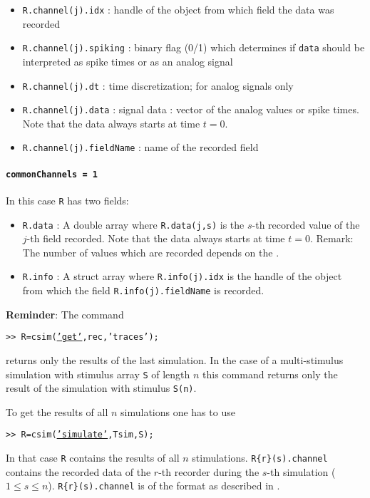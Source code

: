 \begin{itemize}
  
\item \texttt{R.channel(j).idx} : handle of the object from which
  field the data was recorded
  
\item \texttt{R.channel(j).spiking} : binary flag (0/1) which
  determines if \texttt{data} should be interpreted as spike times or
  as an analog signal
  
\item \texttt{R.channel(j).dt} : time discretization; for analog
  signals   only
  
\item \texttt{R.channel(j).data} : signal data : vector of the
  analog values or spike times. Note that the data always starts at
  time $t=0$.
 
\item \texttt{R.channel(j).fieldName} : name of the recorded
    field

\end{itemize}

\paragraph{\texttt{commonChannels = 1}} In this case
\texttt{R} has two fields:
\begin{itemize}
\item \texttt{R.data} : A double array where
  \texttt{R.data(j,s)} is the $s$-th recorded value of the $j$-th
  field recorded.  Note that the data always
  starts at time $t=0$.  {\small Remark: The number of values which
    are recorded depends on the .}
  
\item \texttt{R.info} : A struct array where
  \texttt{R.info(j).idx} is the handle of the object from which
  the field \texttt{R.info(j).fieldName} is recorded.
\end{itemize}


{\bf Reminder}: The command
\begin{tabbing}
\quad\texttt{>> R=csim(\hyperlink{cmd:get}{'get'},rec,'traces');}
\end{tabbing}
returns only the results of the last simulation. In the case of a
multi-stimulus simulation with stimulus array \texttt{S} of length $n$
this command returns only the result of the simulation with stimulus
\texttt{S(n)}.

To get the results of all $n$ simulations one has to use
\begin{tabbing}
\quad\texttt{>> R=csim(\hyperlink{cmd:simulate}{'simulate'},Tsim,S);}
\end{tabbing}

In that case \texttt{R} contains the results of all $n$ stimulations.
\texttt{R\{r\}(s).channel} contains the recorded data of the $r$-th
recorder during the $s$-th simulation ($1 \leq s \leq n$).
\texttt{R\{r\}(s).channel} is of the format as described in
.





